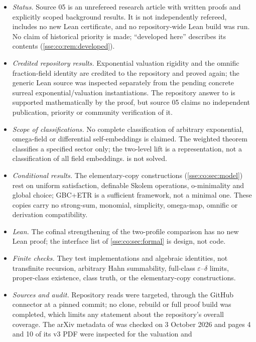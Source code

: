 \documentclass[11pt,a4paper]{article}
\numberwithin{equation}{section}
\theoremstyle{plain}
\theoremstyle{definition}
\theoremstyle{remark}
\begin{document}
\begin{itemize}
\item \emph{Status.} Source 05 is an unrefereed research article with
written proofs and explicitly scoped background results. It is not
independently refereed, includes no new Lean certificate, and no
repository-wide Lean build was run. No claim of historical priority is made;
``developed here'' describes its contents (\cref{sse:co:rem:developed}).
\item \emph{Credited repository results.} Exponential valuation rigidity and
the omnific fraction-field identity are credited to the repository and
proved again; the generic Lean source was inspected separately from the
pending concrete surreal exponential/valuation instantiations. The repository
answer to \cite[Question~5.4]{KKS} is supported mathematically by the proof,
but source 05 claims no independent publication, priority or community
verification of it.
\item \emph{Scope of classifications.} No complete classification of
arbitrary exponential, omega-field or differential self-embeddings is
claimed. The weighted theorem classifies a specified sector only; the
two-level lift is a representation, not a classification of all field
embeddings. \cite[Question~5.6]{KKS} is not solved.
\item \emph{Conditional results.} The elementary-copy constructions
(\cref{sse:co:sec:model}) rest on uniform satisfaction, definable Skolem
operations, o-minimality and global choice; GBC+ETR is a sufficient
framework, not a minimal one. These copies carry no strong-sum, monomial,
simplicity, omega-map, omnific or derivation compatibility.
\item \emph{Lean.} The cofinal strengthening of the two-profile comparison
has no new Lean proof; the interface list of \cref{sse:co:sec:formal} is
design, not code.
\item \emph{Finite checks.} They test implementations and algebraic
identities, not transfinite recursion, arbitrary Hahn summability, full-class
$\varepsilon$--$\delta$ limits, proper-class existence, class truth, or the
elementary-copy constructions.
\item \emph{Sources and audit.} Repository reads were targeted, through the
GitHub connector at a pinned commit; no clone, rebuild or full proof build was
completed, which limits any statement about the repository's overall
coverage. The arXiv metadata of \cite{KKS} was checked on 3 October 2026 and
pages 4 and 10 of its v3 PDF were inspected for the valuation and

\end{itemize}
\end{document}
